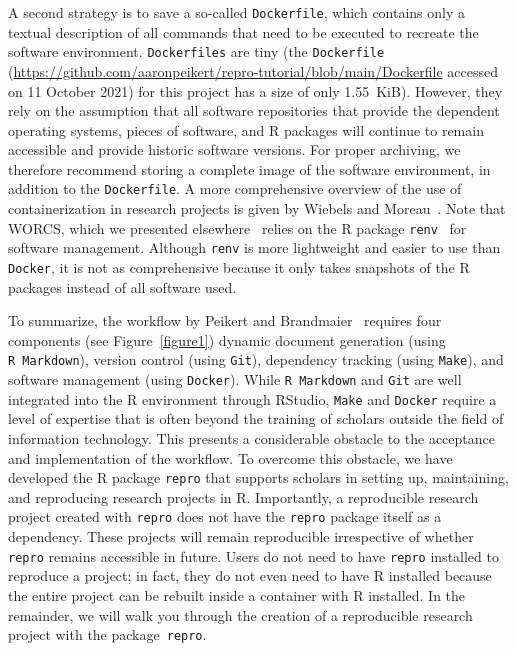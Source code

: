 \documentclass[psych,tutorial,accept,moreauthors,pdftex]{Definitions/mdpi}
\begin{document}
A second strategy is to save a so-called \texttt{Dockerfile}, which
contains only a textual description of all commands that need to be
executed to recreate the software environment. \texttt{Dockerfiles} are
tiny (the {\texttt{Dockerfile}}
 (\url{https://github.com/aaronpeikert/repro-tutorial/blob/main/Dockerfile} accessed on 11 October 2021)
for this project has a size of only 1.55~KiB). However, they rely on the
assumption that all software repositories that provide the dependent
operating systems, pieces of software, and R packages will continue to
remain accessible and provide historic software versions. For proper
archiving, we therefore recommend storing a complete image of the
software environment, in addition to the \texttt{Dockerfile}. A more
comprehensive overview of the use of containerization in research
projects is given by Wiebels and Moreau~\citep{wiebelsLeveragingContainersReproducible2021}. Note that WORCS,
which we presented elsewhere~\citep{vanlissa2020worcs} relies on the R
package \texttt{renv}~\citep{R-renv} for software management. Although
\texttt{renv} is more lightweight and easier to use than \texttt{Docker}, it is not as comprehensive because it only
takes snapshots of the R packages instead of all software used.

To summarize, the workflow by Peikert and Brandmaier~\citep{Peikert2019} requires four
components (see {Figure~\ref{figure1})}
 dynamic document generation (using
\texttt{R\ Markdown}), version control (using \texttt{Git}), dependency
tracking (using \texttt{Make}), and software management (using
\texttt{Docker}). While \texttt{R\ Markdown} and \texttt{Git} are well
integrated into the R environment through RStudio, \texttt{Make} and
\texttt{Docker} require a level of expertise that is often beyond the
training of scholars outside the field of information technology. This
presents a considerable obstacle to the acceptance and implementation of
the workflow. To overcome this obstacle, we have developed the R package
\texttt{repro} that supports scholars in setting up, maintaining, and
reproducing research projects in R. Importantly, a reproducible research
project created with \texttt{repro} does not have the \texttt{repro}
package itself as a dependency. These projects will remain reproducible
irrespective of whether \texttt{repro} remains accessible in future.
Users do not need to have \texttt{repro} installed to reproduce a
project; in fact, they do not even need to have R installed because the
entire project can be rebuilt inside a container with R installed. In
the remainder, we will walk you through the creation of a reproducible
research project with the package~\texttt{repro}.
\end{document}
